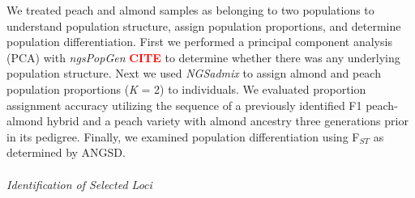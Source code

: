 \documentclass[12pt]{article}
\newcommand{\citex}{\textcolor{red}{\bf CITE }}
\begin{document}
We treated peach and almond samples as belonging to two populations to understand population structure, assign population proportions, and determine population differentiation. 
%
First we performed a principal component analysis (PCA) with \emph{ngsPopGen} \citex to determine whether there was any underlying population structure.
%
Next we used \emph{NGSadmix} \citep{skotte2013estimating} to assign almond and peach population proportions (\emph{K} = 2) to individuals. 
%
We evaluated proportion assignment accuracy utilizing the sequence of a previously identified F1 peach-almond hybrid and a peach variety with almond ancestry three generations prior in its pedigree. 
%
Finally, we examined population differentiation using F$_{ST}$ as determined by ANGSD.
\\
\\
\emph{Identification of Selected Loci}
\end{document}

